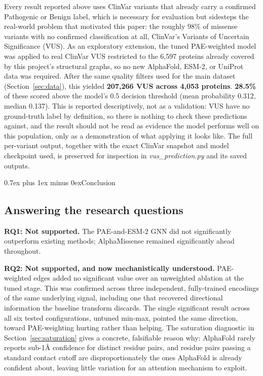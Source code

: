 \documentclass[10pt,conference,a4paper]{IEEEtran}
\makeatletter
\def\section{\@startsection{section}{1}{\z@}{1.5ex plus 1.5ex minus 0.5ex}%
{0.7ex plus 1ex minus 0ex}{\normalfont\normalsize\bfseries\centering}}%
\makeatother
\begin{document}
Every result reported above uses ClinVar variants that already carry a confirmed Pathogenic or Benign label, which is necessary for evaluation but sidesteps the real-world problem that motivated this paper: the roughly 98\% of missense variants with no confirmed classification at all, ClinVar's Variants of Uncertain Significance (VUS). As an exploratory extension, the tuned PAE-weighted model was applied to real ClinVar VUS restricted to the 6{,}597 proteins already covered by this project's structural graphs, so no new AlphaFold, ESM-2, or UniProt data was required. After the same quality filters used for the main dataset (Section~\ref{sec:data}), this yielded \textbf{207,266 VUS across 4,053 proteins}. \textbf{28.5\%} of these scored above the model's 0.5 decision threshold (mean probability 0.312, median 0.137). This is reported descriptively, not as a validation: VUS have no ground-truth label by definition, so there is nothing to check these predictions against, and the result should not be read as evidence the model performs well on this population, only as a demonstration of what applying it looks like. The full per-variant output, together with the exact ClinVar snapshot and model checkpoint used, is preserved for inspection in \textit{vus\_prediction.py} and its saved outputs.

\section{Conclusion}
\label{sec:conclusion}

\subsection{Answering the research questions}

\textbf{RQ1: Not supported.} The PAE-and-ESM-2 GNN did not significantly outperform existing methods; AlphaMissense remained significantly ahead throughout.

\textbf{RQ2: Not supported, and now mechanistically understood.} PAE-weighted edges added no significant value over an unweighted ablation at the tuned stage. This was confirmed across three independent, fully-trained encodings of the same underlying signal, including one that recovered directional information the baseline transform discards. The single significant result across all six tested configurations, untuned min-max, pointed the same direction, toward PAE-weighting hurting rather than helping. The saturation diagnostic in Section~\ref{sec:saturation} gives a concrete, falsifiable reason why: AlphaFold rarely reports sub-1\r{A} confidence for distinct residue pairs, and residue pairs passing a standard contact cutoff are disproportionately the ones AlphaFold is already confident about, leaving little variation for an attention mechanism to exploit.
\end{document}
